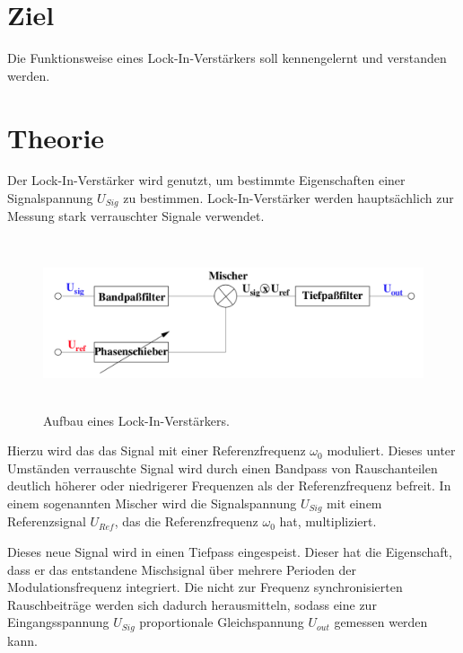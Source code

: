 \section{Ziel}
\label{sec:Ziel}

Die Funktionsweise eines Lock-In-Verstärkers soll kennengelernt und verstanden werden. 

\section{Theorie}
\label{sec:Theorie}

Der Lock-In-Verstärker wird genutzt, um bestimmte Eigenschaften einer Signalspannung 
$U_{Sig}$ zu bestimmen. Lock-In-Verstärker werden hauptsächlich zur Messung stark
verrauschter Signale verwendet.

\begin{figure}
    \centering
    \includegraphics[width=12cm, height=5cm]{build/lockin1.png}
    \caption{Aufbau eines Lock-In-Verstärkers.}
\end{figure}

\noindent Hierzu wird das das Signal mit einer Referenzfrequenz $\omega_0$ moduliert.
Dieses unter Umständen verrauschte Signal wird durch einen Bandpass von Rauschanteilen 
deutlich höherer oder niedrigerer Frequenzen als der Referenzfrequenz befreit.
In einem sogenannten Mischer wird die Signalspannung $U_{Sig}$ mit einem Referenzsignal 
$U_{Ref}$, das die Referenzfrequenz $\omega_0$ hat, multipliziert. 

\noindent Dieses neue Signal wird in einen Tiefpass eingespeist. Dieser hat die 
Eigenschaft, dass er das entstandene Mischsignal über mehrere Perioden der 
Modulationsfrequenz integriert.
Die nicht zur Frequenz synchronisierten Rauschbeiträge werden sich dadurch 
herausmitteln, sodass eine zur Eingangsspannung $U_{Sig}$ proportionale Gleichspannung 
$U_{out}$ gemessen werden kann. 

